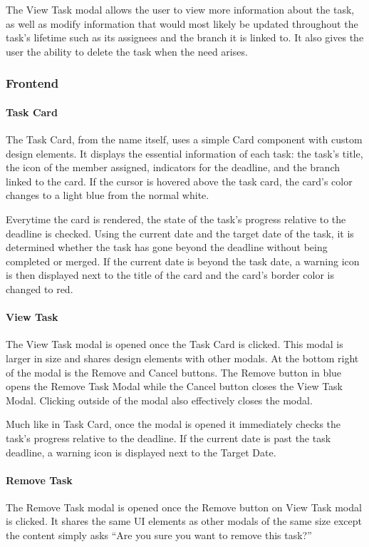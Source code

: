 \documentclass{article}
\begin{document}
The View Task modal allows the user to view more information about the task, as
well as modify information that would most likely be updated throughout the
task’s lifetime such as its assignees and the branch it is linked to. It also
gives the user the ability to delete the task when the need arises.

\subsubsection{Frontend}
\paragraph{Task Card}
The Task Card, from the name itself, uses a simple Card component with custom
design elements. It displays the essential information of each task: the task’s
title, the icon of the member assigned, indicators for the deadline, and the
branch linked to the card. If the cursor is hovered above the task card, the
card’s color changes to a light blue from the normal white.

Everytime the card is rendered, the state of the task’s progress relative to the
deadline is checked. Using the current date and the target date of the task, it
is determined whether the task has gone beyond the deadline without being
completed or merged. If the current date is beyond the task date, a warning icon
is then displayed next to the title of the card and the card’s border color is
changed to red.

\paragraph{View Task}
The View Task modal is opened once the Task Card is clicked. This modal is
larger in size and shares design elements with other modals. At the bottom right
of the modal is the Remove and Cancel buttons. The Remove button in blue opens
the Remove Task Modal while the Cancel button closes the View Task Modal.
Clicking outside of the modal also effectively closes the modal.

Much like in Task Card, once the modal is opened it immediately checks the
task’s progress relative to the deadline. If the current date is past the task
deadline, a warning icon is displayed next to the Target Date.

\paragraph{Remove Task}
The Remove Task modal is opened once the Remove button on View Task modal is
clicked. It shares the same UI elements as other modals of the same size except
the content simply asks “Are you sure you want to remove this task?”
\end{document}
